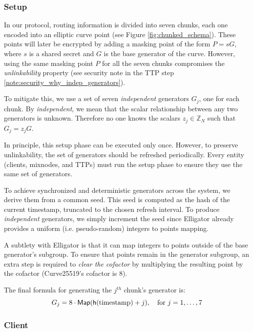 \subsubsection{Setup}

In our protocol, routing information is divided into seven chunks, each one encoded into an elliptic curve point (see Figure \ref{fig:chunked_schema}). 
These points will later be encrypted by adding a masking point of the form $ P = s G $, where $ s $ is a shared secret and $ G $ is the base generator of the curve.
However, using the same masking point $ P $ for all the seven chunks compromises the \textit{unlinkability} property
(see security note in the TTP step \ref{note:security_why_indep_generators}).

To mitigate this, we use a set of seven \textit{independent} generators $ G_j $, one for each chunk. 
By \textit{independent}, we mean that the scalar relationship between any two generators is unknown. 
Therefore no one knows the scalars $ z_j \in \mathbb{Z}_N $ such that $ G_j = z_j G $.

In principle, this setup phase can be executed only once. 
However, to preserve unlinkability, the set of generators should be refreshed periodically. 
Every entity (clients, mixnodes, and TTPs) must run the setup phase to ensure they use the same set of generators.

To achieve synchronized and deterministic generators across the system, we derive them from a common seed. 
This seed is computed as the hash of the current timestamp, truncated to the chosen refresh interval. 
To produce \textit{independent} generators, we simply increment the seed since Elligator already provides a uniform (i.e. pseudo-random) integers to points mapping.

A subtlety with Elligator is that it can map integers to points outside of the base generator's subgroup.
To ensure that points remain in the generator subgroup, an extra step is required to \textit{clear the cofactor} by multiplying the resulting point by the cofactor (Curve25519's cofactor is $ 8 $).

\noindent The final formula for generating the $ j^{th} $ chunk’s generator is:
\begin{equation}
G_j = 8 \cdot \Map{\hash{\text{timestamp}} + j}, \quad \text{for } j = 1, \dots, 7
\end{equation}


\subsubsection{Client}
  
